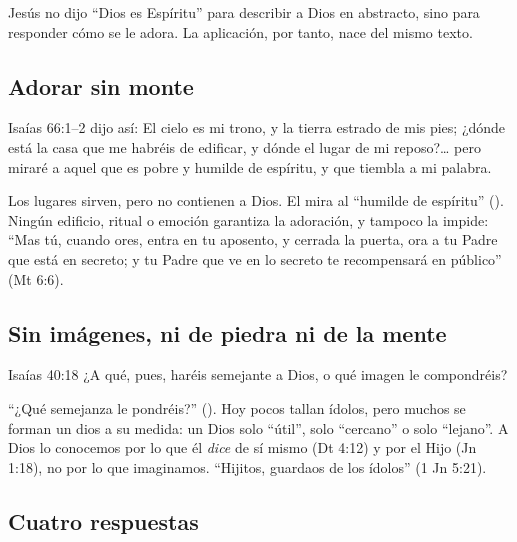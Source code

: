 Jesús no dijo ``Dios es Espíritu'' para describir a Dios en abstracto, sino para responder cómo se le adora. La aplicación, por tanto, nace del mismo texto.

\subsection{Adorar sin monte}

\begin{verso}{Isaías 66:1–2}
\SENOR{} dijo así: El cielo es mi trono, y la tierra estrado de mis pies; ¿dónde está la casa que me habréis de edificar, y dónde el lugar de mi reposo?\ldots{} pero miraré a aquel que es pobre y humilde de espíritu, y que tiembla a mi palabra.
\end{verso}

Los lugares sirven, pero no contienen a Dios. El \SENOR{} mira al ``humilde de espíritu'' (). Ningún edificio, ritual o emoción garantiza la adoración, y tampoco la impide: ``Mas tú, cuando ores, entra en tu aposento, y cerrada la puerta, ora a tu Padre que está en secreto; y tu Padre que ve en lo secreto te recompensará en público'' (Mt 6:6).

\subsection{Sin imágenes, ni de piedra ni de la mente}

\begin{verso}{Isaías 40:18}
¿A qué, pues, haréis semejante a Dios, o qué imagen le compondréis?
\end{verso}

``¿Qué semejanza le pondréis?'' (). Hoy pocos tallan ídolos, pero muchos se forman un dios a su medida: un Dios solo ``útil'', solo ``cercano'' o solo ``lejano''. A Dios lo conocemos por lo que él \emph{dice} de sí mismo (Dt 4:12) y por el Hijo (Jn 1:18), no por lo que imaginamos. ``Hijitos, guardaos de los ídolos'' (1 Jn 5:21).

\subsection{Cuatro respuestas}

